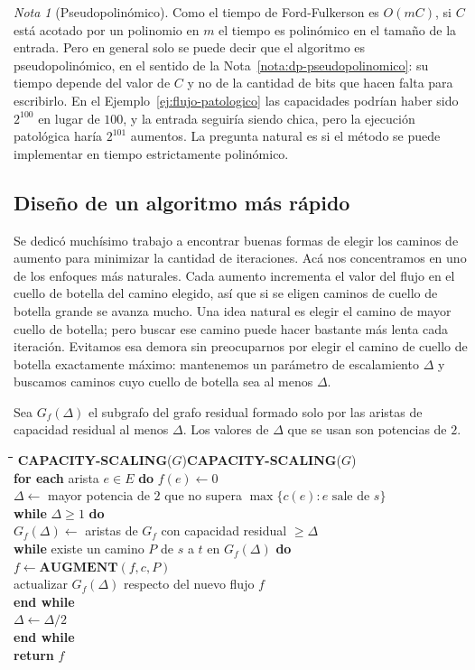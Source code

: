 \documentclass[12pt, spanish, oneside, openany]{book}
\newcommand{\pl}[1]{\makebox[1.6em][r]{\texttt{\footnotesize #1}}\hspace{0.9em}}
\newenvironment{pseudo}[1]{%
  \begin{center}%
  \begin{mdframed}[style=pseudobox]%
  \small
  \begin{tabbing}%
  \hspace{2.5em}\=\hspace{1.5em}\=\hspace{1.5em}\=\hspace{1.5em}\=\hspace{1.5em}\=\kill
  \def\pseudotitulo{#1}\ifx\pseudotitulo\empty\else#1\\[3pt]\fi}%
  {\end{tabbing}\end{mdframed}\end{center}}
\theoremstyle{uprightplain}
\theoremstyle{definition}
\theoremstyle{remark}
\newtheorem{nota}[teorema]{Nota}
\theoremstyle{definition}
\begin{document}
\begin{nota}[Pseudopolinómico]
\label{nota:flujo-pseudopolinomico}
Como el tiempo de Ford-Fulkerson es $O(mC)$, si $C$ está acotado por un polinomio en $m$ el tiempo es polinómico en el tamaño de la entrada. Pero en general solo se puede decir que el algoritmo es pseudopolinómico, en el sentido de la Nota~\ref{nota:dp-pseudopolinomico}: su tiempo depende del valor de $C$ y no de la cantidad de bits que hacen falta para escribirlo. En el Ejemplo~\ref{ej:flujo-patologico} las capacidades podrían haber sido $2^{100}$ en lugar de $100$, y la entrada seguiría siendo chica, pero la ejecución patológica haría $2^{101}$ aumentos. La pregunta natural es si el método se puede implementar en tiempo estrictamente polinómico.
\end{nota}

\subsection{Diseño de un algoritmo más rápido}

Se dedicó muchísimo trabajo a encontrar buenas formas de elegir los caminos de aumento para minimizar la cantidad de iteraciones. Acá nos concentramos en uno de los enfoques más naturales. Cada aumento incrementa el valor del flujo en el cuello de botella del camino elegido, así que si se eligen caminos de cuello de botella grande se avanza mucho. Una idea natural es elegir el camino de mayor cuello de botella; pero buscar ese camino puede hacer bastante más lenta cada iteración. Evitamos esa demora sin preocuparnos por elegir el camino de cuello de botella exactamente máximo: mantenemos un parámetro de escalamiento $\Delta$ y buscamos caminos cuyo cuello de botella sea al menos $\Delta$.

Sea $G_f(\Delta)$ el subgrafo del grafo residual formado solo por las aristas de capacidad residual al menos $\Delta$. Los valores de $\Delta$ que se usan son potencias de $2$.

\begin{pseudo}{\textbf{CAPACITY-SCALING}($G$)}
\pl{1}\> \textbf{for each} arista $e\in E$ \textbf{do} $f(e)\leftarrow 0$\\
\pl{2}\> $\Delta\leftarrow$ mayor potencia de $2$ que no supera $\max\{c(e): e\text{ sale de }s\}$\\
\pl{3}\> \textbf{while} $\Delta\ge 1$ \textbf{do}\\
\pl{4}\>\> $G_f(\Delta)\leftarrow$ aristas de $G_f$ con capacidad residual $\ge\Delta$\\
\pl{5}\>\> \textbf{while} existe un camino $P$ de $s$ a $t$ en $G_f(\Delta)$ \textbf{do}\\
\pl{6}\>\>\> $f\leftarrow\textbf{AUGMENT}(f,c,P)$\\
\pl{7}\>\>\> actualizar $G_f(\Delta)$ respecto del nuevo flujo $f$\\
\pl{8}\>\> \textbf{end while}\\
\pl{9}\>\> $\Delta\leftarrow\Delta/2$\\
\pl{10}\> \textbf{end while}\\
\pl{11}\> \textbf{return} $f$
\end{pseudo}
\end{document}
